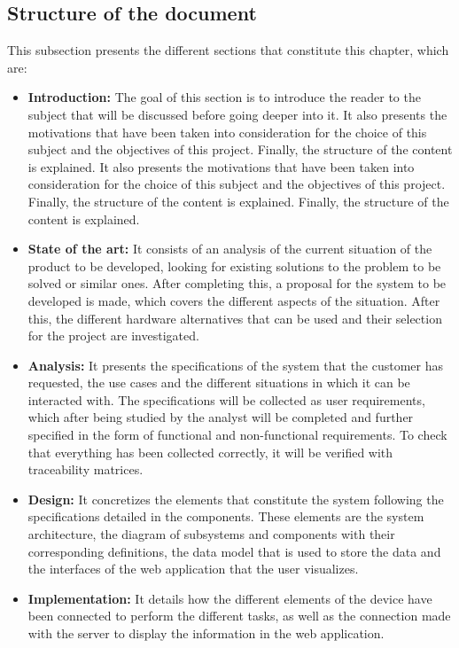 \subsection{Structure of the document}\label{subsec:structure-of-the-document}
This subsection presents the different sections that constitute this chapter, which are:
\begin{itemize}
	\item \textbf{Introduction:} The goal of this section is to introduce the reader to the subject that will be discussed before going deeper into it. It also presents the motivations that have been taken into consideration for the choice of this subject and the objectives of this project. Finally, the structure of the content is explained. It also presents the motivations that have been taken into consideration for the choice of this subject and the objectives of this project. Finally, the structure of the content is explained. Finally, the structure of the content is explained.
	\item \textbf{State of the art:} It consists of an analysis of the current situation of the product to be developed, looking for existing solutions to the problem to be solved or similar ones. After completing this, a proposal for the system to be developed is made, which covers the different aspects of the situation. After this, the different hardware alternatives that can be used and their selection for the project are investigated.
	\item \textbf{Analysis:}  It presents the specifications of the system that the customer has requested, the use cases and the different situations in which it can be interacted with. The specifications will be collected as user requirements, which after being studied by the analyst will be completed and further specified in the form of functional and non-functional requirements. To check that everything has been collected correctly, it will be verified with traceability matrices.
	\item \textbf{Design:}  It concretizes the elements that constitute the system following the specifications detailed in the components. These elements are the system architecture, the diagram of subsystems and components with their corresponding definitions, the data model that is used to store the data and the interfaces of the web application that the user visualizes.
	\item \textbf{Implementation:}  It details how the different elements of the device have been connected to perform the different tasks, as well as the connection made with the server to display the information in the web application.

\end{itemize}
